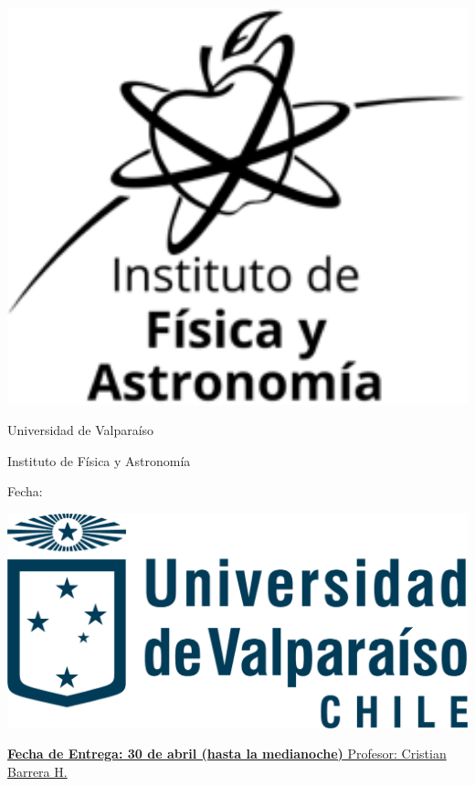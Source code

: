 	\noindent
	\begin{minipage}[l]{0.1\textwidth}
		\noindent
		\includegraphics[width=1.1\textwidth]{../logos/logo_ifa.png}
	\end{minipage}
\hfill
\begin{minipage}[c]{0.7\textwidth}
	\begin{center}
	{\large	Universidad de Valpara\'iso \par
	 \large Instituto de F\'isica y Astronom\'ia \par
	 \large \textbf{\examtitle}	\par
	 \large \textbf{\coursename}	\par
   \small	Fecha: \examdate}
	\end{center}
\end{minipage}
\hfill
	\begin{minipage}[r]{0.1\textwidth}
		\noindent
		\includegraphics[width=2.0\textwidth]{../logos/logo_uv.png}
	\end{minipage}
\par
\vspace{0.2in}
\noindent
\uline{\textbf{Fecha de Entrega: 30 de abril (hasta la medianoche)}
  \hfill Profesor: Cristian Barrera H.}
\par 
\vspace{0.15in}


\vspace{0.15in}

\noindent
\centering
